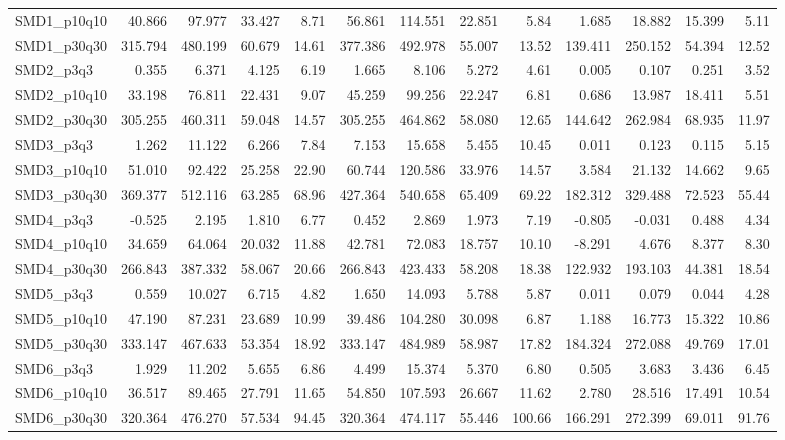 \begin{longtable}{lrrrrrrrrrrrr}
SMD1\_p10q10 & 40.866 & 97.977 & 33.427 & 8.71 & 56.861 & 114.551 & 22.851 & 5.84 & 1.685 & 18.882 & 15.399 & 5.11 \\
SMD1\_p30q30 & 315.794 & 480.199 & 60.679 & 14.61 & 377.386 & 492.978 & 55.007 & 13.52 & 139.411 & 250.152 & 54.394 & 12.52 \\
SMD2\_p3q3 & 0.355 & 6.371 & 4.125 & 6.19 & 1.665 & 8.106 & 5.272 & 4.61 & 0.005 & 0.107 & 0.251 & 3.52 \\
SMD2\_p10q10 & 33.198 & 76.811 & 22.431 & 9.07 & 45.259 & 99.256 & 22.247 & 6.81 & 0.686 & 13.987 & 18.411 & 5.51 \\
SMD2\_p30q30 & 305.255 & 460.311 & 59.048 & 14.57 & 305.255 & 464.862 & 58.080 & 12.65 & 144.642 & 262.984 & 68.935 & 11.97 \\
SMD3\_p3q3 & 1.262 & 11.122 & 6.266 & 7.84 & 7.153 & 15.658 & 5.455 & 10.45 & 0.011 & 0.123 & 0.115 & 5.15 \\
SMD3\_p10q10 & 51.010 & 92.422 & 25.258 & 22.90 & 60.744 & 120.586 & 33.976 & 14.57 & 3.584 & 21.132 & 14.662 & 9.65 \\
SMD3\_p30q30 & 369.377 & 512.116 & 63.285 & 68.96 & 427.364 & 540.658 & 65.409 & 69.22 & 182.312 & 329.488 & 72.523 & 55.44 \\
SMD4\_p3q3 & -0.525 & 2.195 & 1.810 & 6.77 & 0.452 & 2.869 & 1.973 & 7.19 & -0.805 & -0.031 & 0.488 & 4.34 \\
SMD4\_p10q10 & 34.659 & 64.064 & 20.032 & 11.88 & 42.781 & 72.083 & 18.757 & 10.10 & -8.291 & 4.676 & 8.377 & 8.30 \\
SMD4\_p30q30 & 266.843 & 387.332 & 58.067 & 20.66 & 266.843 & 423.433 & 58.208 & 18.38 & 122.932 & 193.103 & 44.381 & 18.54 \\
SMD5\_p3q3 & 0.559 & 10.027 & 6.715 & 4.82 & 1.650 & 14.093 & 5.788 & 5.87 & 0.011 & 0.079 & 0.044 & 4.28 \\
SMD5\_p10q10 & 47.190 & 87.231 & 23.689 & 10.99 & 39.486 & 104.280 & 30.098 & 6.87 & 1.188 & 16.773 & 15.322 & 10.86 \\
SMD5\_p30q30 & 333.147 & 467.633 & 53.354 & 18.92 & 333.147 & 484.989 & 58.987 & 17.82 & 184.324 & 272.088 & 49.769 & 17.01 \\
SMD6\_p3q3 & 1.929 & 11.202 & 5.655 & 6.86 & 4.499 & 15.374 & 5.370 & 6.80 & 0.505 & 3.683 & 3.436 & 6.45 \\
SMD6\_p10q10 & 36.517 & 89.465 & 27.791 & 11.65 & 54.850 & 107.593 & 26.667 & 11.62 & 2.780 & 28.516 & 17.491 & 10.54 \\
SMD6\_p30q30 & 320.364 & 476.270 & 57.534 & 94.45 & 320.364 & 474.117 & 55.446 & 100.66 & 166.291 & 272.399 & 69.011 & 91.76 \\

\end{longtable}
